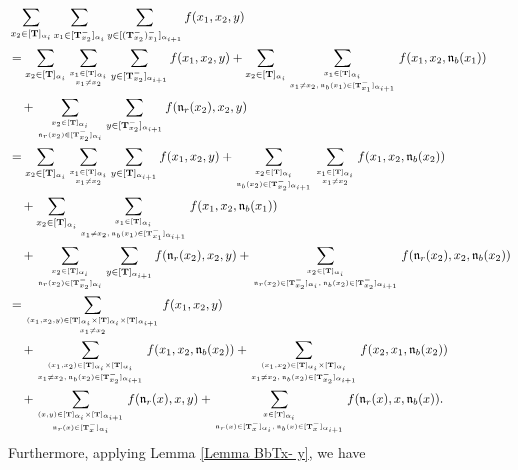 \documentclass[12pt]{amsart}
\numberwithin{equation}{thm}
\newcommand\bT{\mathbf T}
\newcommand\fn{\mathfrak n}
\renewcommand\a{\alpha}  %
\begin{document}
\begin{align*}
&\sum_{x_2 \in [\bT]_{\a_i}} \sum_{x_1 \in [\bT_{x_2}^-]_{\a_i}} \sum_{y \in [(\bT_{x_2}^-)_{x_1}^-]_{\a_{i+1}}} 
	f(x_1,x_2,y) 
\\
&= \sum_{x_2 \in [\bT]_{\a_i}} \sum_{x_1 \in [\bT]_{\a_i} \atop x_1 \not=x_2} \sum_{y \in [\bT_{x_2}^-]_{\a_{i+1}}}
		f(x_1,x_2,y)
	+ \sum_{x_2 \in [\bT]_{\a_i}} \sum_{x_1 \in [\bT]_{\a_i} \atop x_1 \not=x_2, \, \fn_b(x_1) \in [\bT_{x_1}^-]_{\a_{i+1}}} 
		f(x_1,x_2, \fn_b(x_1))
	\\ & \quad 
	+ \sum_{x_2 \in [\bT]_{\a_i} \atop \fn_r(x_2) \in [\bT_{x_2}^-]_{\a_i}}  \sum_{y \in [\bT_{x_2}^-]_{\a_{i+1}}}
		f(\fn_r(x_2),x_2,y) 
\\
&= \sum_{x_2 \in [\bT]_{\a_i}} \sum_{x_1 \in [\bT]_{\a_i} \atop x_1 \not=x_2} \sum_{y \in [\bT]_{\a_{i+1}}}
		f(x_1,x_2,y)
	+\sum_{x_2 \in [\bT]_{\a_i} \atop \fn_b(x_2) \in [\bT_{x_2}^-]_{\a_{i+1}}} \sum_{x_1 \in [\bT]_{\a_i} \atop x_1 \not=x_2} 
		f(x_1,x_2,\fn_b(x_2))
	\\ & \quad 
	+ \sum_{x_2 \in [\bT]_{\a_i}} \sum_{x_1 \in [\bT]_{\a_i} \atop x_1 \not=x_2, \, \fn_b(x_1) \in [\bT_{x_1}^-]_{\a_{i+1}}} 
		f(x_1,x_2, \fn_b(x_1))
	\\ & \quad 
	+ \sum_{x_2 \in [\bT]_{\a_i} \atop \fn_r(x_2) \in [\bT_{x_2}^-]_{\a_i}}  \sum_{y \in [\bT]_{\a_{i+1}}}
		f(\fn_r(x_2),x_2,y) 
	+ \sum_{x_2 \in [\bT]_{\a_i} \atop \fn_r(x_2) \in [\bT_{x_2}^-]_{\a_i}, \, \fn_b(x_2) \in [\bT_{x_2}^-]_{\a_{i+1}}}  
		f(\fn_r(x_2),x_2, \fn_b(x_2)) 
\\
&= \sum_{(x_1,x_2,y) \in [\bT]_{\a_i} \times [\bT]_{\a_i} \times [\bT]_{\a_{i+1}} \atop x_1 \not=x_2} 
		f (x_1,x_2,y) 
	\\ & \quad 
	+ \sum_{(x_1,x_2) \in [\bT]_{\a_i} \times [\bT]_{\a_i} \atop x_1 \not=x_2, \, \fn_b(x_2) \in [\bT_{x_2}^-]_{\a_{i+1}}} 
		f (x_1,x_2, \fn_b(x_2)) 
	+ \sum_{(x_1,x_2) \in [\bT]_{\a_i} \times [\bT]_{\a_i} \atop x_1 \not=x_2, \, \fn_b(x_2) \in [\bT_{x_2}^-]_{\a_{i+1}}} 
		f (x_2,x_1, \fn_b(x_2))  
	\\ & \quad 
	+ \sum_{ (x,y) \in [\bT]_{\a_i} \times [\bT]_{\a_{i+1}} \atop \fn_r (x) \in [\bT_{x}^-]_{\a_i}} 
		f (\fn_r(x), x, y) 
	+ \sum_{x \in [\bT]_{\a_i} \atop \fn_r(x) \in [\bT_x^-]_{\a_i}, \, \fn_b(x) \in [\bT_x^-]_{\a_{i+1}}} 
		f (\fn_r(x), x, \fn_b(x)).  
\end{align*}
Furthermore, 
applying Lemma \ref{Lemma BbTx- y}, we have 
\end{document}

